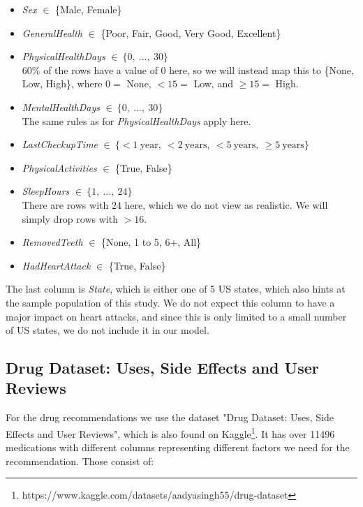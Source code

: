 \documentclass{article}
\begin{document}
\begin{itemize}
    \item \textit{Sex} $\in$ \{Male, Female\}
    \item \textit{GeneralHealth} $\in$ \{Poor, Fair, Good, Very Good, Excellent\}
    \item \textit{PhysicalHealthDays} $\in\ \{ 0,\ \dots,\ 30 \}$\\
    $60\%$ of the rows have a value of $0$ here, so we will instead map this to
    \{None, Low, High\}, where $0 = $ None, $<15 = $ Low, and $\geq15 =$ High.
    \item \textit{MentalHealthDays}  $\in\ \{ 0,\ \dots,\ 30 \}$\\
    The same rules as for \textit{PhysicalHealthDays} apply here.
    \item \textit{LastCheckupTime} $\in\ \{<1\ \text{year},\ <2\ \text{years},\ <5\ \text{years},\ \geq 5\ \text{years}\}$
    \item \textit{PhysicalActivities} $\in$ \{True, False\}
    \item \textit{SleepHours}  $\in\ \{ 1,\ \dots,\ 24 \}$\\
    There are rows with $24$ here, which we do not view as realistic.
    We will simply drop rows with $>16$.
    \item \textit{RemovedTeeth} $\in$ \{None, 1 to 5, 6+, All\}
    \item \textit{HadHeartAttack} $\in$ \{True, False\}
\end{itemize}

The last column is \textit{State}, which is either one of 5 US states,
which also hints at the sample population of this study.
We do not expect this column to have a major impact on heart attacks,
and since this is only limited to a small number of US states, we do not include it in our model.



\subsection{Drug Dataset: Uses, Side Effects and User Reviews}
For the drug recommendations we use the dataset "Drug Dataset: Uses, Side Effects and User Reviews", which is also found on Kaggle\footnote{https://www.kaggle.com/datasets/aadyasingh55/drug-dataset}. It has over 11496 medications with different columns representing different factors we need for the recommendation. Those consist of:
\end{document}
